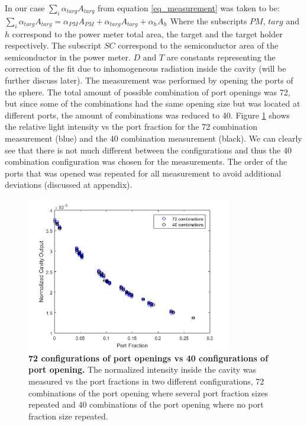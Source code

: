 \documentclass[a4paper]{article}
\begin{document}
In our case $\sum_{i}\alpha_{targ}A_{targ}$ from equation \ref{eq_measurement} was taken to be: $\sum_{i}\alpha_{targ}A_{targ}=\alpha_{PM} A_{PM}+\alpha_{targ} A_{targ}+\alpha_{h} A_{h}$ Where the subscripts $PM$, $targ$ and $h$ correspond to the power meter total area, the target and the target holder respectively. The subscript $SC$ correspond to the semiconductor area of the semiconductor in the power meter. $D$ and $T$ are constants representing the correction of the fit due to inhomogeneous radiation inside the cavity (will be further discuss later). The measurement was performed by opening the ports of the sphere. The total amount of possible combination of port openings was 72, but since some of the combinations had the same opening size but was located at different ports, the amount of combinations was reduced to 40. Figure \ref{fig:72vs40} shows the relative light intensity vs the port fraction for the 72 combination measurement (blue) and the 40 combination measurement (black). We can clearly see that there is not much different between the configurations and thus the 40 combination configuration was chosen for the measurements. The order of the ports that was opened was repeated for all measurement to avoid additional deviations (discussed at appendix).

\begin{figure}
\centering
\includegraphics[width=0.8\textwidth]{figures/72vs40.png}
\caption{\textbf{72 configurations of port openings vs 40 configurations of port opening.} The normalized intensity inside the cavity was measured vs the port fractions in two different configurations, 72 combinations of the port opening where several port fraction sizes repeated and 40 combinations of the port opening where no port fraction size repeated.}
\label{fig:72vs40}
\end{figure}
\end{document}
